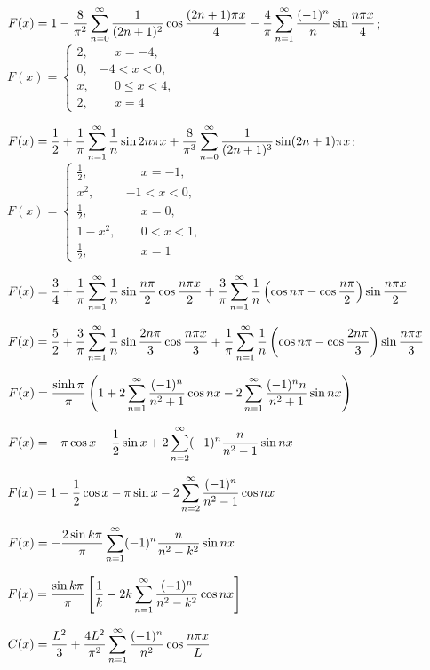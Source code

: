 $\displaystyle
F(x)=1-\frac{8}{\pi^2}\sum_{n=0}^\infty\frac{1}{(2n+1)^2}\cos\frac{(2n+1)\pi
x}{4} -\frac{4}{\pi}\sum_{n=1}^\infty\frac{(-1)^n}{n}\sin\frac{n\pi
x}{4}$; $F(x)=
\begin{cases}
2,&\phantom{-}x=-4,\\
0,&-4<x<0,\\
x,&\phantom{-}0\le x<4,\\
2,&\phantom{-}x=4
\end{cases}$

$F(x)=\displaystyle\frac{1}{2}+\frac{1}{\pi}\sum_{n=1}^\infty\frac{1}{n}\sin2n\pi x
+\frac{8}{\pi^3}\sum_{n=0}^\infty\frac{1}{(2n+1)^3}\sin(2n+1)\pi x$; $F(x)=
\begin{cases}
\frac{1}{2},&\phantom{-}x=-1,\\
x^2,&-1< x<0,\\
\frac{1}{2},&\phantom{-}x=0,\\
1-x^2,&\phantom{-}0<x<1,\\
\frac{1}{2},&\phantom{-}x=1
\end{cases}$

$F(x)=\displaystyle\frac{3}{4}+\frac{1}{\pi}\sum_{n=1}^\infty
\frac{1}{n}\sin\frac{n\pi}{2}\cos\frac{n\pi x}{2}+\frac{3}{\pi}
\sum_{n=1}^\infty \frac{1}{n}\left(\cos
n\pi-\cos\frac{n\pi}{2}\right)\sin\frac{n\pi x}{2}$

 $F(x)=\displaystyle\frac{5}{2}+\frac{3}{\pi}\sum_{n=1}^\infty
\frac{1}{n}\sin\frac{2n\pi}{3}\cos\frac{n\pi x}{3}+\frac{1}{\pi}
\sum_{n=1}^\infty \frac{1}{n}\left(\cos
n\pi-\cos\frac{2n\pi}{3}\right)\sin\frac{n\pi x}{3}$

 $F(x)=\displaystyle\frac{\sinh\pi}{\pi}\left(
1+2\sum_{n=1}^\infty\frac{(-1)^n}{n^2+1}\cos
nx-2\sum_{n=1}^\infty\frac{(-1)^nn}{n^2+1}\sin nx\right)$

$F(x)=\displaystyle-\pi\cos x-\frac{1}{2}\sin x+2\sum_{n=2}^\infty
(-1)^n\frac{n}{n^2-1}\sin nx$

$F(x)=\displaystyle1-\frac{1}{2}\cos x-\pi\sin x-2\sum_{n=2}^\infty
\frac{(-1)^n}{n^2-1}\cos nx$

$F(x)=-\displaystyle\frac{2\sin k\pi}{\pi}\sum_{n=1}^\infty(-1)^n\frac{n}{n^2-k^2}\sin nx$

$F(x)=\displaystyle\frac{\sin
k\pi}{\pi}\left[\frac{1}{k}-2k\sum_{n=1}^\infty\frac{(-1)^n}{n^2-k^2}\cos nx\right]$



$C(x)=\displaystyle\frac{L^2}{3}+\frac{4L^2}{\pi^2}\sum_{n=1}^\infty\frac{(-1)^n}{n^2}\cos\frac{n\pi x}{L}$

